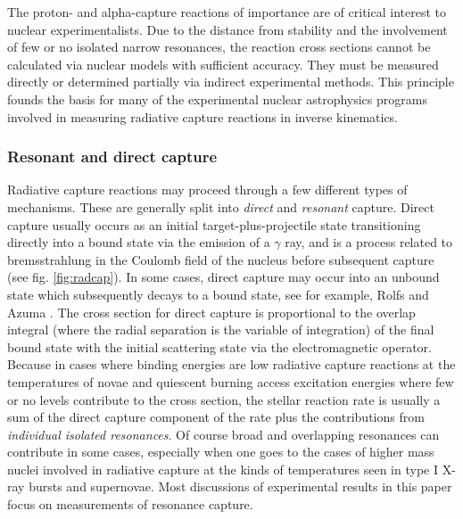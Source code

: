 The proton- and alpha-capture reactions of importance are of critical interest to nuclear experimentalists. Due to the distance from stability and the involvement of few or no isolated narrow resonances, the reaction cross sections cannot be calculated via nuclear models with sufficient accuracy. They must be measured directly or determined partially via indirect experimental methods. This principle founds the basis for many of the experimental nuclear astrophysics programs involved in measuring radiative capture reactions in inverse kinematics.   

\subsubsection{Resonant and direct capture}
\label{resonant}

Radiative capture reactions may proceed through a few different types of mechanisms. These are generally split into {\em direct} and {\em resonant} capture. Direct capture usually occurs as an initial target-plus-projectile state transitioning directly into a bound state via the emission of a $\gamma$ ray, and is a process related to bremsstrahlung in the Coulomb field of the nucleus before subsequent capture (see fig. \ref{fig:radcap}). In some cases, direct capture may occur into an unbound state which subsequently decays to a bound state, see for example, Rolfs and Azuma \cite{rolfs74}. The cross section for direct capture is proportional to the overlap integral (where the radial separation is the variable of integration) of the final bound state with the initial scattering state via the electromagnetic operator. Because in cases where binding energies are low radiative capture reactions at the temperatures of novae and quiescent burning access excitation energies where few or no levels contribute to the cross section, the stellar reaction rate is usually a sum of the direct capture component of the rate plus the contributions from  {\em individual isolated resonances}. Of course broad and overlapping resonances can contribute in some cases, especially when one goes to the cases of higher mass nuclei involved in radiative capture at the kinds of temperatures seen in type I X-ray bursts and supernovae. Most discussions of experimental results in this paper focus on measurements of resonance capture. 

